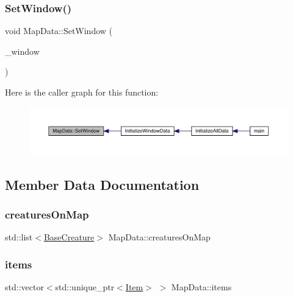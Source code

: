 \subsubsection{\texorpdfstring{Set\+Window()}{SetWindow()}}
{\footnotesize\ttfamily void Map\+Data\+::\+Set\+Window (\begin{DoxyParamCaption}\item[{sf\+::\+Render\+Window $\ast$}]{\+\_\+window }\end{DoxyParamCaption})}

Here is the caller graph for this function\+:
\nopagebreak
\begin{figure}[H]
\begin{center}
\leavevmode
\includegraphics[width=350pt]{de/d83/class_map_data_a2c65f950748fe264276e292f8a5b92f5_icgraph}
\end{center}
\end{figure}


\subsection{Member Data Documentation}
\mbox{\label{class_map_data_a9a096967eb9377ffb6c3afd937540319}} 
\subsubsection{\texorpdfstring{creatures\+On\+Map}{creaturesOnMap}}
{\footnotesize\ttfamily std\+::list$<$\mbox{\hyperlink{class_base_creature}{Base\+Creature}}$>$ Map\+Data\+::creatures\+On\+Map}

\mbox{\label{class_map_data_a21cf5ee5508940f91b56046186aa6dec}} 
\subsubsection{\texorpdfstring{items}{items}}
{\footnotesize\ttfamily std\+::vector$<$std\+::unique\+\_\+ptr$<$\mbox{\hyperlink{class_item}{Item}}$>$ $>$ Map\+Data\+::items}

